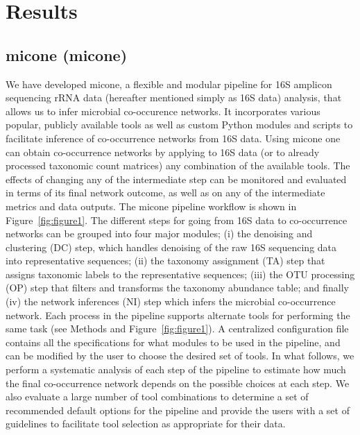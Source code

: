 
\section*{Results}

  \subsection*{\acl{micone} (\acs{micone})}

  We have developed \ac{micone}, a flexible and modular pipeline for 16S amplicon sequencing rRNA data (hereafter mentioned simply as 16S data) analysis, that allows us to infer microbial co-occurence networks.
  It incorporates various popular, publicly available tools as well as custom Python modules and scripts to facilitate inference of co-occurrence networks from 16S data. Using \ac{micone} one can obtain co-occurrence networks by applying to 16S data (or to already processed taxonomic count matrices) any combination of the available tools. The effects of changing any of the intermediate step can be monitored and evaluated in terms of its final network outcome, as well as on any of the intermediate metrics and data outputs.
  The \ac{micone} pipeline workflow is shown in Figure~\ref{fig:figure1}.
  The different steps for going from 16S data to co-occurrence networks can be grouped into four major modules; (i) the denoising and clustering (DC) step, which handles denoising of the raw 16S sequencing data into representative sequences; (ii) the taxonomy assignment (TA) step that assigns taxonomic labels to the representative sequences; (iii) the OTU processing (OP) step that filters and transforms the taxonomy abundance table; and finally (iv) the network inferences (NI) step which infers the microbial co-occurrence network.
  Each process in the pipeline supports alternate tools for performing the same task (see Methods and Figure~\ref{fig:figure1}). A centralized configuration file contains all the specifications for what modules to be used in the pipeline, and can be modified by the user to choose the desired set of tools.
  In what follows, we perform a systematic analysis of each step of the pipeline to estimate how much the final co-occurrence network depends on the possible choices at each step. We also evaluate a large number of tool combinations to determine a set of recommended default options for the pipeline and provide the users with a set of guidelines to facilitate tool selection as appropriate for their data.

